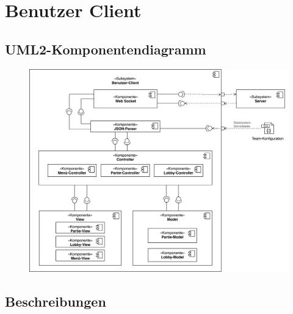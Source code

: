\section{Benutzer Client}

	\subsection{UML2-Komponentendiagramm}

		\begin{figure}[H]
    		\centering
    		\includegraphics[scale=0.1]{images/komponentendiagramm_benutzer-client.png}
		\end{figure}

	\subsection{Beschreibungen}

